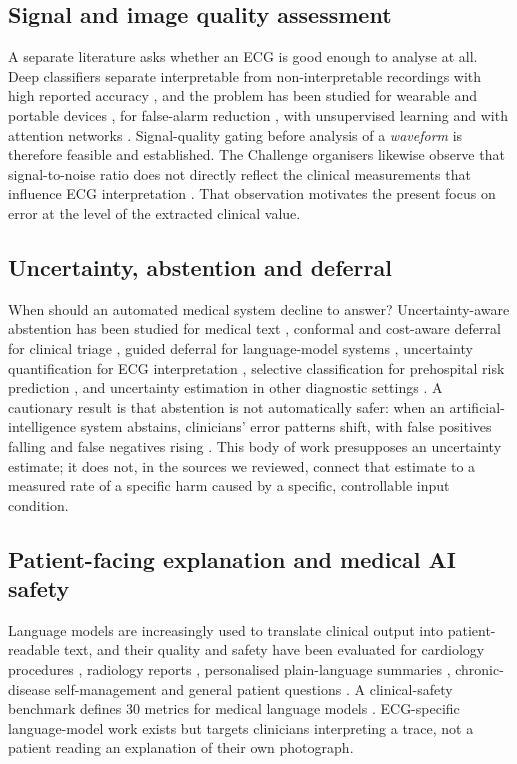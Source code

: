 \subsection{Signal and image quality assessment}
A separate literature asks whether an ECG is good enough to analyse at all. Deep classifiers separate interpretable from non-interpretable recordings with high reported accuracy \citep{ref12}, and the problem has been studied for wearable and portable devices \citep{ref13,ref15,ref16,ref19,ref20}, for false-alarm reduction \citep{ref17,ref18}, with unsupervised learning \citep{ref14,ref21} and with attention networks \citep{ref22}. Signal-quality gating before analysis of a \emph{waveform} is therefore feasible and established. The Challenge organisers likewise observe that signal-to-noise ratio does not directly reflect the clinical measurements that influence ECG interpretation \citep{ref2}. That observation motivates the present focus on error at the level of the extracted clinical value.

\subsection{Uncertainty, abstention and deferral}
When should an automated medical system decline to answer? Uncertainty-aware abstention has been studied for medical text \citep{ref23}, conformal and cost-aware deferral for clinical triage \citep{ref24,ref27}, guided deferral for language-model systems \citep{ref25}, uncertainty quantification for ECG interpretation \citep{ref30,ref31}, selective classification for prehospital risk prediction \citep{ref32}, and uncertainty estimation in other diagnostic settings \citep{ref28,ref29}. A cautionary result is that abstention is not automatically safer: when an artificial-intelligence system abstains, clinicians' error patterns shift, with false positives falling and false negatives rising \citep{ref26}. This body of work presupposes an uncertainty estimate; it does not, in the sources we reviewed, connect that estimate to a measured rate of a specific harm caused by a specific, controllable input condition.

\subsection{Patient-facing explanation and medical AI safety}
Language models are increasingly used to translate clinical output into patient-readable text, and their quality and safety have been evaluated for cardiology procedures \citep{ref33}, radiology reports \citep{ref38}, personalised plain-language summaries \citep{ref34}, chronic-disease self-management \citep{ref39} and general patient questions \citep{ref40,ref41,ref42,ref43}. A clinical-safety benchmark defines 30 metrics for medical language models \citep{ref35}. ECG-specific language-model work exists \citep{ref36,ref37} but targets clinicians interpreting a trace, not a patient reading an explanation of their own photograph.

